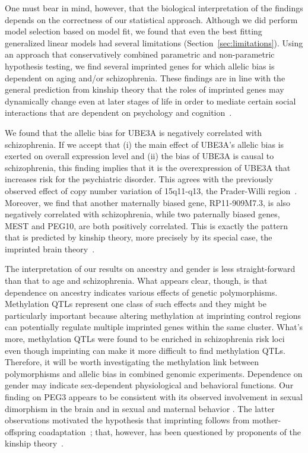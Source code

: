 \documentclass[letterpaper]{article}
\begin{document}
  One
must bear in mind, however, that the biological interpretation of the findings
depends on the correctness of our statistical approach.  Although we did
perform model selection based on model fit, we found that even the best
fitting generalized linear models had several limitations
(Section~\ref{sec:limitations}).  Using an approach that conservatively
combined parametric and non-parametric hypothesis testing, we find several
imprinted genes for which allelic bias is dependent on aging and/or
schizophrenia. These findings are in line with the general prediction from
kinship theory that the roles of imprinted genes may dynamically change even
at later stages of life in order to mediate certain social interactions that
are dependent on psychology and cognition~\cite{Ubeda2012,Wilkins2003}.

We found that the allelic bias for UBE3A is negatively correlated with
schizophrenia.  If we accept that (i) the main effect of UBE3A's allelic bias
is exerted on overall expression level and (ii) the bias of UBE3A is causal to
schizophrenia, this finding implies that it is the overexpression of UBE3A
that increases risk for the psychiatric disorder.  This agrees with the previously
observed effect of copy number variation of 15q11-q13, the Prader-Willi
region~\cite{McNamara2013}.  Moreover, we find that another maternally biased
gene, RP11-909M7.3, is also negatively correlated with schizophrenia, while
two paternally biased genes, MEST and PEG10, are both positively correlated.
This is exactly the pattern that is predicted by kinship theory, more
precisely by its special case, the imprinted brain theory~\cite{Crespi2008a}.

The interpretation of our results on ancestry and gender is less
straight-forward than that to age and schizophrenia.  What appears clear,
though, is that dependence on ancestry indicates various effects of genetic
polymorphisms.   Methylation QTLs represent one class of such effects and they
might be particularly important because altering methylation at imprinting
control regions can potentially regulate multiple imprinted genes within the
same cluster.  What's more, methylation QTLs were found to be enriched in
schizophrenia risk loci~\cite{Hannon2016} even though imprinting can make it
more difficult to find methylation QTLs.  Therefore, it will be worth
investigating the methylation link between polymorphisms and allelic bias in
combined genomic experiments.  Dependence on gender may indicate sex-dependent
physiological and behavioral functions.  Our finding on PEG3 appears to be
consistent with its observed involvement in sexual dimorphism in the brain and
in sexual and maternal behavior \cite{Broad2009}.  The latter observations
motivated the hypothesis that imprinting follows from mother-offspring
coadaptation~\cite{Keverne2015}; that, however, has been questioned by
proponents of the kinship theory~\cite{Haig2014}.
\end{document}

